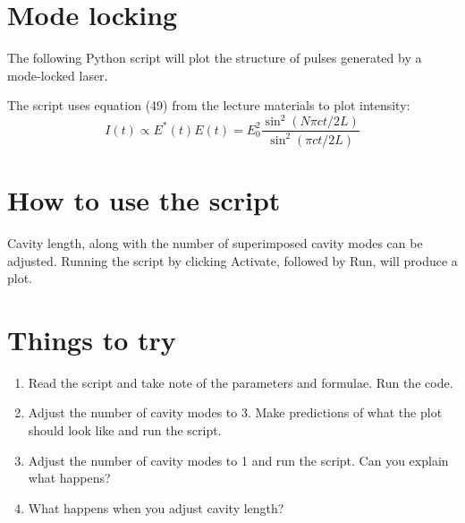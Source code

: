 \documentclass{article}
\begin{document}
\section{Mode locking}

The following Python script will plot the structure of pulses generated by a mode-locked laser. \par\medskip 
\noindent The script uses equation (49) from the lecture materials to plot intensity:
\[I(t)\propto E^*(t)E(t) = E_0^2\frac{\sin^2(N\pi ct/2L)}{\sin^2(\pi ct/2L)}\]

\section{How to use the script}
Cavity length, along with the number of superimposed cavity modes can be adjusted. Running the script by clicking Activate, followed by Run, will produce a plot.

\section{Things to try}
\begin{enumerate}
\item Read the script and take note of the parameters and formulae. Run the code.
\item Adjust the number of cavity modes to 3. Make predictions of what the plot should look like and run the script.
\item Adjust the number of cavity modes to 1 and run the script. Can you explain what happens?
\item What happens when you adjust cavity length?
\end{enumerate}
\end{document}
